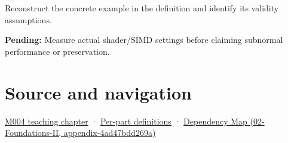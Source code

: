 Reconstruct the concrete example in the definition and identify its validity assumptions.

\textbf{Pending:} Measure actual shader/SIMD settings before claiming subnormal performance or preservation.

\section{Source and navigation}\label{appendix-e979eb012782-source-and-navigation}

\href{Continuous\%20Notes/Computing\%20Foundations\%20-\%20From\%20Bits\%20to\%20C++\%20and\%20Systems\%20APIs\#A\%20stretching\%20ruler\%20for\%20real-valued\%20quantities}{M004 teaching chapter} · \hyperref[appendix-fd090d982a15-m004---parts-61-76]{Per-part definitions} · \href{../02-Foundations-II/main.pdf\#nameddest=appendix-4ad47bdd269a}{Dependency Map (02-Foundations-II, appendix-4ad47bdd269a)}
